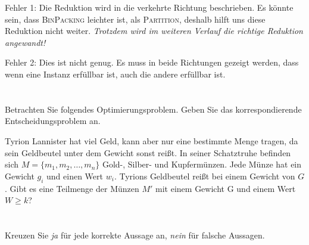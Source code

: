 \documentclass{article}
\begin{document}
\begin{solution}[4]
Fehler 1: Die Reduktion wird in die verkehrte Richtung beschrieben. Es könnte sein, dass \textsc{BinPacking} leichter ist, als \textsc{Partition}, deshalb hilft uns diese Reduktion nicht weiter. \emph{Trotzdem wird im weiteren Verlauf die richtige Reduktion angewandt!}

Fehler 2: Dies ist nicht genug. Es muss in beide Richtungen gezeigt werden, dass wenn eine Instanz erfüllbar ist, auch die andere erfüllbar ist.
\end{solution}


\section{}
Betrachten Sie folgendes Optimierungsproblem. Geben Sie das korrespondierende Entscheidungsproblem an.


\begin{solution}[4]
Tyrion Lannister hat viel Geld, kann aber nur eine bestimmte Menge tragen, da sein Geldbeutel unter dem Gewicht sonst reißt.
In seiner Schatztruhe befinden sich $M = \{m_1, m_2, \dots, m_n\}$ Gold-, Silber- und Kupfermünzen. Jede Münze hat ein Gewicht $g_i$ und einen Wert $w_i$. Tyrions Geldbeutel reißt bei einem Gewicht von $G$.
Gibt es eine Teilmenge der Münzen $M'$ mit einem Gewicht G und einem Wert $W \geq k$?
\end{solution}


\section{}
Kreuzen Sie \emph{ja} für jede korrekte Aussage an, \emph{nein} für falsche Aussagen.
\end{document}
